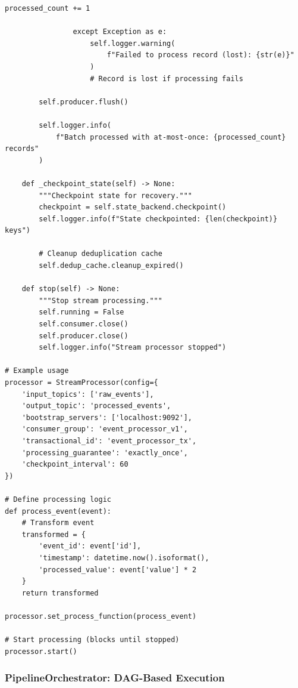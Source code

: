 \begin{lstlisting}[style=python, caption=StreamProcessor with Exactly-Once Guarantees]
                    processed_count += 1

                except Exception as e:
                    self.logger.warning(
                        f"Failed to process record (lost): {str(e)}"
                    )
                    # Record is lost if processing fails

        self.producer.flush()

        self.logger.info(
            f"Batch processed with at-most-once: {processed_count} records"
        )

    def _checkpoint_state(self) -> None:
        """Checkpoint state for recovery."""
        checkpoint = self.state_backend.checkpoint()
        self.logger.info(f"State checkpointed: {len(checkpoint)} keys")

        # Cleanup deduplication cache
        self.dedup_cache.cleanup_expired()

    def stop(self) -> None:
        """Stop stream processing."""
        self.running = False
        self.consumer.close()
        self.producer.close()
        self.logger.info("Stream processor stopped")

# Example usage
processor = StreamProcessor(config={
    'input_topics': ['raw_events'],
    'output_topic': 'processed_events',
    'bootstrap_servers': ['localhost:9092'],
    'consumer_group': 'event_processor_v1',
    'transactional_id': 'event_processor_tx',
    'processing_guarantee': 'exactly_once',
    'checkpoint_interval': 60
})

# Define processing logic
def process_event(event):
    # Transform event
    transformed = {
        'event_id': event['id'],
        'timestamp': datetime.now().isoformat(),
        'processed_value': event['value'] * 2
    }
    return transformed

processor.set_process_function(process_event)

# Start processing (blocks until stopped)
processor.start()
\end{lstlisting}

\subsubsection{PipelineOrchestrator: DAG-Based Execution}

